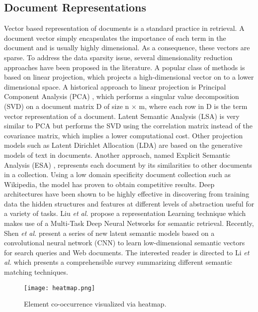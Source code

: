 \subsection{Document Representations}
Vector based representation of documents is a standard practice in retrieval. 
A document vector simply encapsulates the importance of each 
term in the document and is usually highly dimensional. As a consequence, 
these vectors are sparse. To address the data
sparsity issue, several dimensionality reduction approaches have been proposed 
in the literature. A popular class of
methods is based on linear projection, which projects a high-dimensional vector on to a lower dimensional space. 
A historical approach to linear projection is Principal Component Analysis (PCA) 
\cite{jolliffe1986principal}, which performs a singular value decomposition 
(SVD) on a document matrix D of size n $\times$ m, where each row in D is the 
term vector representation of a document. Latent Semantic Analysis (LSA) 
\cite{deerwester1990indexing} is very similar to PCA but performs the SVD using 
the correlation matrix instead of the covariance matrix, which implies a lower 
computational cost. Other projection models such as Latent Dirichlet Allocation 
(LDA) \cite{blei2003latent} are based on the generative models of text in documents. 
Another approach, named Explicit Semantic Analysis (ESA) 
\cite{gabrilovich2007computing}, represents each document by its similarities to other documents in a collection. 
Using a low domain specificity document collection such 
as Wikipedia, the model has proven to obtain competitive results. Deep 
architectures have been shown to be highly effective in discovering from 
training data the hidden structures and features at different levels of 
abstraction useful for a variety of tasks. Liu \textit{et al.} 
\cite{liu2015representation} propose a representation Learning technique which 
makes use of a Multi-Task Deep Neural Networks for semantic retrieval. Recently, 
Shen \textit{et al.} \cite{shen2014learning} present a series of new latent 
semantic models based on a convolutional neural network (CNN) to learn 
low-dimensional semantic vectors for search queries and Web documents. The 
interested reader is directed to Li \textit{et al.} \cite{li2014semantic} which 
presents a comprehensible survey summarizing different semantic matching 
techniques.
\begin{figure*}[t]
        \centering
        \texttt{[image: heatmap.png]}
        \caption{Element co-occurrence visualized via heatmap.}
        \label{fig:heatmap}
\end{figure*}
